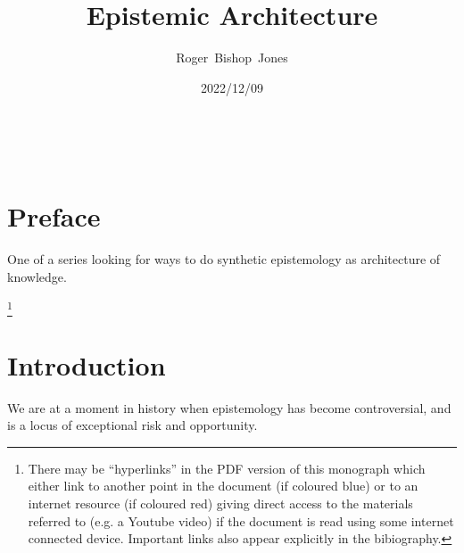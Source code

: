 \documentclass[10pt,titlepage]{article}
\title{\LARGE\bf Epistemic Architecture}
\author{Roger~Bishop~Jones}
\date{\small 2022/12/09}
\newcommand{\ignore}[1]{}
\begin{document}
                               
\begin{titlepage}
\maketitle





\end{titlepage}

\ \

\ignore{
\begin{centering}
{}
\end{centering}
}%

\setcounter{tocdepth}{2}
{\parskip-0pt\tableofcontents}


\pagebreak

\section*{Preface}


One of a series looking for ways to do synthetic epistemology as architecture of knowledge.

\footnote{There may be ``hyperlinks'' in the PDF version of this monograph which either link to another point in the document  (if coloured blue) or to an internet resource  (if coloured red) giving direct access to the materials referred to (e.g. a Youtube video) if the document is read using some internet connected device.
Important links also appear explicitly in the bibiography.}

\section{Introduction}

We are at a moment in history when epistemology has become controversial, and is a locus of exceptional risk and opportunity.
\end{document}
